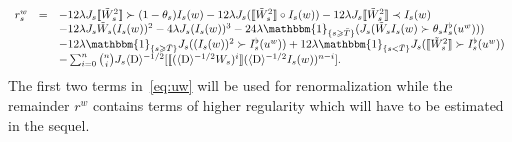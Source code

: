 \documentclass[11pt]{article}
\newcommand{\mathD}{\mathrm{D}}
\begin{document}
\begin{equation}
  \begin{array}{lll}
    r_s^w & = & - 12 \lambda J_s \llbracket \tilde{W}_s^2 \rrbracket \succ (1
    - \theta_s) I_s (w) - 12 \lambda J_s (\llbracket \tilde{W}_s^2 \rrbracket
    \circ I_s (w)) - 12 \lambda J_s \llbracket \tilde{W}_s^2 \rrbracket \prec
    I_s (w)\\
    &  & - 12 \lambda J_s \tilde{W}_s (I_s (w))^2 - 4 \lambda J_s (I_s (w))^3
    - 24 \lambda \mathbbm{1}_{\{ s \geqslant \bar{T} \}} (J_s (\tilde{W}_s I_s
    (w) \succ \theta_s I^{\flat}_s (u^w)))\\
    &  & - 12 \lambda \mathbbm{1}_{\{ s \geqslant \bar{T} \}} J_s ((I_s
    (w))^2 \succ I^{\flat}_s (u^w)) + 12 \lambda \mathbbm{1}_{\{ s < \bar{T}
    \}} J_s (\llbracket \tilde{W}_s^2 \rrbracket \succ I_s^{\flat} (u^w))\\
    &  & - \sum_{i = 0}^n \binom{n}{i} J_s \langle \mathD \rangle^{- 1 / 2}
    [\llbracket (\langle \mathD \rangle^{- 1 / 2} W_s)^i \rrbracket (\langle
    \mathD \rangle^{- 1 / 2} I_s (w))^{n - i}] .
  \end{array} \label{eq:rw}
\end{equation}
The first two terms in~{\eqref{eq:uw}} will be used for renormalization while
the remainder $r^w$ contains terms of higher regularity which will have to be
estimated in the sequel.
\end{document}
